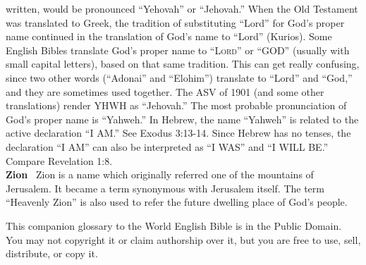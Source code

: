written, would be pronounced ``Yehovah'' or ``Jehovah.'' When the Old
Testament was translated to Greek, the tradition of substituting
``Lord'' for God's proper name continued in the translation of God's
name to ``Lord'' (Kurios). Some English Bibles translate God's proper
name to ``\textsc{Lord}'' or ``GOD'' (usually with small capital
letters), based on that same tradition. This can get really confusing,
since two other words (``Adonai'' and ``Elohim'') translate to ``Lord''
and ``God,'' and they are sometimes used together. The ASV of 1901 (and
some other translations) render YHWH as ``Jehovah.'' The most probable
pronunciation of God's proper name is ``Yahweh.'' In Hebrew, the name
``Yahweh'' is related to the active declaration ``I AM.'' See Exodus
3:13-14. Since Hebrew has no tenses, the declaration ``I AM'' can also
be interpreted as ``I WAS'' and ``I WILL BE.'' Compare Revelation 1:8.\\
\textbf{Zion}~ Zion is a name which originally referred one of the
mountains of Jerusalem. It became a term synonymous with Jerusalem
itself. The term ``Heavenly Zion'' is also used to refer the future
dwelling place of God's people.

This companion glossary to the World English Bible is in the Public
Domain. You may not copyright it or claim authorship over it, but you
are free to use, sell, distribute, or copy it.
